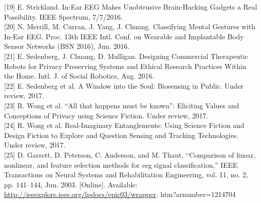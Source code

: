 \documentclass[11pt]{article}
\begin{document}
[19] E. Strickland. In-Ear EEG Makes Unobtrusive Brain-Hacking Gadgets a Real Possibility.
IEEE Spectrum, 7/7/2016.
\hspace{0pt} \\

[20]
N. Merrill, M. Curran, J. Yang, J. Chuang. Classifying Mental Gestures with In-Ear EEG.
Proc. 13th IEEE Intl. Conf. on Wearable and Implantable Body Sensor Networks (BSN
2016), Jun. 2016.
\hspace{0pt} \\

[21]
E. Sedenberg, J. Chuang, D. Mulligan. Designing Commercial Therapeutic Robots for
Privacy Preserving Systems and Ethical Research Practices Within the Home. Intl. J. of
Social Robotics, Aug. 2016.
\hspace{0pt} \\

[22] E. Sedenberg et al. A Window into the Soul: Biosensing in Public. Under review, 2017.
\hspace{0pt} \\

[23] R. Wong et al. “All that happens must be known”: Eliciting Values and Conceptions of
Privacy using Science Fiction. Under review, 2017.
\hspace{0pt} \\

[24]
R. Wong et al. Real-Imaginary Entanglements: Using Science Fiction and Design Fiction to
Explore and Question Sensing and Tracking Technologies. Under review, 2017.
\hspace{0pt} \\

[25] D. Garrett, D. Peterson, C. Anderson, and M. Thaut, “Comparison
of linear, nonlinear, and feature selection methods for eeg
signal classification,” IEEE Transactions on Neural Systems and
Rehabilitation Engineering, vol. 11, no. 2, pp. 141–144, Jun. 2003.
[Online]. Available: \url{http://ieeexplore.ieee.org/lpdocs/epic03/wrapper}.
htm?arnumber=1214704
\hspace{0pt} \\
\end{document}
